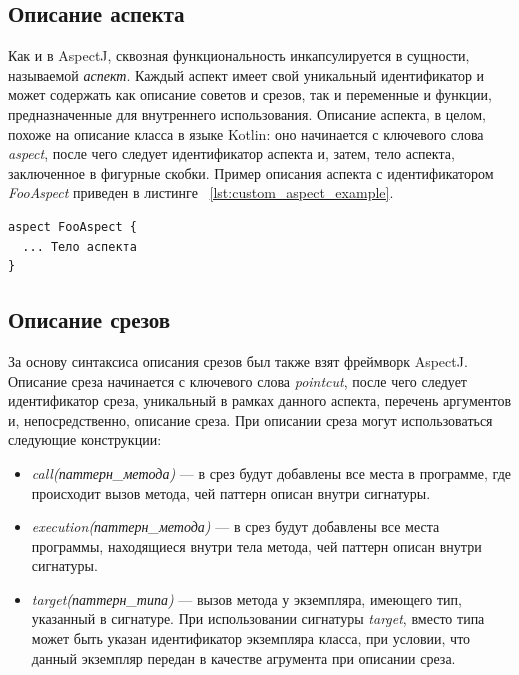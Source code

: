 \subsection{Описание аспекта}
\label{sub:custom_aspect_syntax}
Как и в AspectJ, сквозная функциональность инкапсулируется в сущности,
называемой \textit{аспект}.
Каждый аспект имеет свой уникальный идентификатор и может содержать как описание
советов и срезов, так и переменные и функции, предназначенные для внутреннего
использования.
Описание аспекта, в целом, похоже на описание класса в языке Kotlin: оно
начинается с ключевого слова \textit{aspect}, после чего следует идентификатор
аспекта и, затем, тело аспекта, заключенное в фигурные скобки.
Пример описания аспекта с идентификатором \textit{FooAspect} приведен в листинге
~\ref{lst:custom_aspect_example}.
  \begin{lstlisting}[style={java}, label={lst:custom_aspect_example}, 
  caption={Пример описания аспекта в разрабатываемом прототипе}]
aspect FooAspect {
  ... Тело аспекта
}
  \end{lstlisting}
\subsection{Описание срезов}
\label{sub:custom_pointcut_syntax}
За основу синтаксиса описания срезов был также взят фреймворк AspectJ.
Описание среза начинается с ключевого слова \textit{pointcut}, после чего
следует идентификатор среза, уникальный в рамках данного аспекта, перечень
аргументов и, непосредственно, описание среза.
При описании среза могут использоваться следующие конструкции:
\begin{itemize}
	\item \textit{call(паттерн\_метода)} --- в срез будут добавлены все места в
		  программе, где происходит вызов метода, чей паттерн описан внутри
	  	сигнатуры.
	\item \textit{execution(паттерн\_метода)} --- в срез будут добавлены все
		  места программы, находящиеся внутри тела метода, чей паттерн описан внутри
		  сигнатуры.
	\item \textit{target(паттерн\_типа)} --- вызов метода у экземпляра, имеющего
		  тип, указанный в сигнатуре.
		  При использовании сигнатуры \textit{target}, вместо типа может быть указан
		  идентификатор экземпляра класса, при условии, что данный экземпляр передан
		  в качестве агрумента при описании среза.
\end{itemize}


